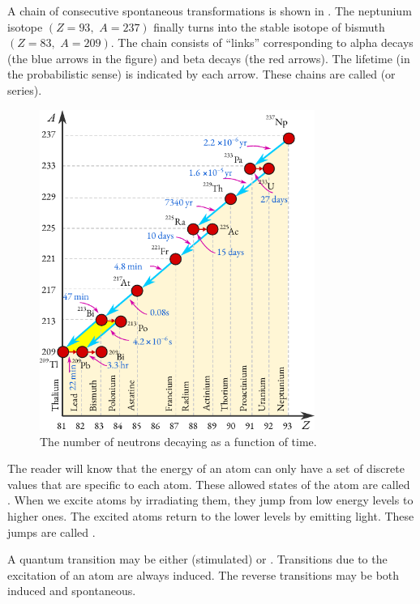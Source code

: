 A chain of consecutive spontaneous transformations is shown in
. The neptunium isotope  $(Z = 93, \,\, A = 237)$ finally turns into the stable isotope of bismuth  $(Z = 83, \,\,A = 209)$. The chain consists of ``links'' corresponding to alpha decays (the blue arrows in the figure) and beta decays (the red arrows). The lifetime (in the probabilistic sense) is indicated by each arrow. These chains are called  (or series).

\begin{figure}[!ht]
\centering
\includegraphics[width=0.8\textwidth]{figures/spont-fission.pdf}
\caption{The number of neutrons decaying as a function of time.\label{spon-fission}}
\end{figure}

 The reader will
know that the energy of an atom can only have a set of discrete values
that are specific to each atom. These allowed states of the atom are
called . When we excite atoms by irradiating them, they
jump from low energy levels to higher ones. The excited atoms return to
the lower levels by emitting light. These jumps are called .


A quantum transition may be either  (stimulated) or
. Transitions due to the excitation of an atom are always
induced. The reverse transitions may be both induced and spontaneous.

